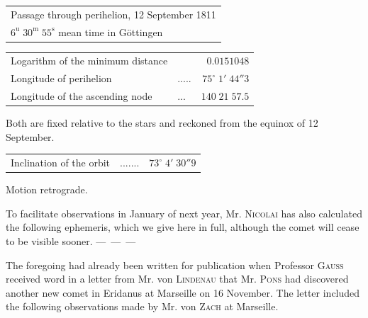 \begin{center}\fontsize{10}{12}\selectfont\setlength{\tabcolsep}{4pt}\renewcommand{\arraystretch}{1.15}\begin{tabular}{l}
Passage through perihelion, 12 September 1811\\
\quad $6^{\mathrm u}\;30^{\mathrm m}\;55^{\mathrm s}$ mean time in Göttingen\\
\end{tabular}\end{center}
\begin{center}\fontsize{10}{12}\selectfont\setlength{\tabcolsep}{3pt}\renewcommand{\arraystretch}{1.15}\begin{tabular}{llr}
Logarithm of the minimum distance &  & $0.0151048$\\
Longitude of perihelion & .\;.\;.\;.\;. & $75^\circ\;1'\;44''3$\\
Longitude of the ascending node & .\;.\;. & $140\;21\;57.5$\\
\end{tabular}\end{center}
\noindent Both are fixed relative to the stars and reckoned from the equinox of 12 September.
\begin{center}\fontsize{10}{12}\selectfont\setlength{\tabcolsep}{3pt}\renewcommand{\arraystretch}{1.15}\begin{tabular}{llr}
Inclination of the orbit & .\;.\;.\;.\;.\;.\;. & $73^\circ\;4'\;30''9$\\
\end{tabular}\end{center}
\noindent Motion retrograde.

\par\indent To facilitate observations in January of next year, Mr. \textsc{Nicolai} has also calculated the following ephemeris, which we give here in full, although the comet will cease to be visible sooner. \mbox{--- --- ---}


\par\indent The foregoing had already been written for publication when Professor \textsc{Gauss} received word in a letter from Mr. von \textsc{Lindenau} that Mr. \textsc{Pons} had discovered another new comet in Eridanus at Marseille on 16 November. The letter included the following observations made by Mr. von \textsc{Zach} at Marseille.

